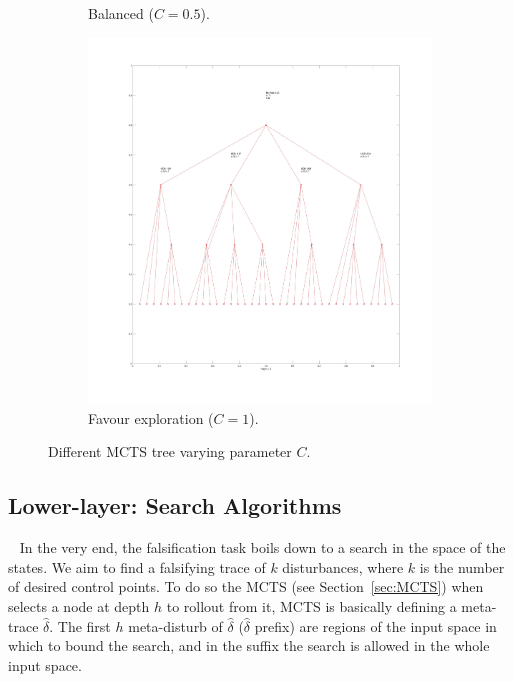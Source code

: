 \documentclass[11pt]{article}
\begin{document}
\begin{figure}
\begin{subfigure}{.33\textwidth}
  \caption{Balanced ($C=0.5$).}
  \label{fig:c05}
\end{subfigure}%
\begin{subfigure}{.33\textwidth}
  \centering
  \includegraphics[width=\linewidth]{img/c1.jpg}
  \caption{Favour exploration ($C=1$).}
  \label{fig:c1}
\end{subfigure}
\caption{Different MCTS tree varying parameter $C$.}
\label{fig:C}
\end{figure}

\subsection{Lower-layer: Search Algorithms}~\label{sec:srcalg}
In the very end, the falsification task boils down to a search in the space of the states. 
We aim to find a falsifying trace of $k$ disturbances, where $k$ is the number of desired control points. 
To do so the MCTS (see Section~\ref{sec:MCTS}) when selects a node at depth $h$ to rollout from it, MCTS is basically defining a meta-trace $\hat{\delta}$. The first $h$ meta-disturb of $\hat{\delta}$ ($\hat{\delta}$ prefix) are regions of the input space in which to bound the search, and in the suffix the search is allowed in the whole input space. 
\end{document}
